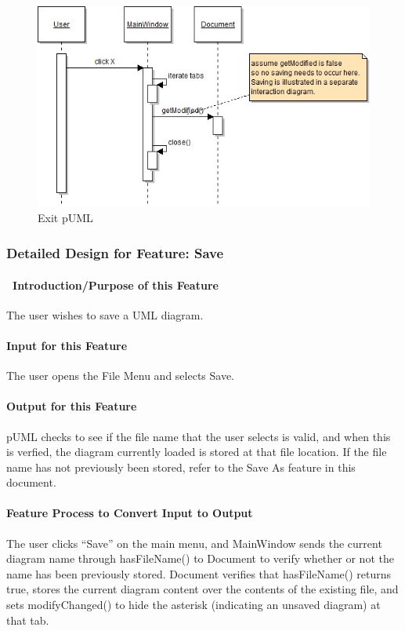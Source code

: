 \documentclass[twoside,letterpaper]{article}
\begin{document}
{\begin{figure}[h]
\centering
\includegraphics[width=6.0in]{IntExit.jpg}
\caption{Exit pUML}
\end{figure}
\clearpage



% 
%

\subsubsection{Detailed Design for Feature: Save }

\paragraph[\ Introduction/Purpose of this Feature]
{\ Introduction/Purpose of this Feature}
{
The user wishes to save a UML diagram.
}

\paragraph[Input for this Feature]{Input for this Feature}
{
The user opens the File Menu and selects Save.
}

\paragraph{Output for this Feature}
{
pUML checks to see if the file name that the user selects is valid, and when this is verfied, the diagram currently loaded is stored at that file location. \newline
If the file name has not previously been stored, refer to the Save As feature in this document.
}

\paragraph{Feature Process to Convert Input to Output}
{
The user clicks ``Save'' on the main menu, and MainWindow sends the current diagram name through hasFileName() to Document to verify whether or not the name has been previously stored. Document verifies that hasFileName() returns true, stores the current diagram content over the contents of the existing file, and sets modifyChanged() to hide the asterisk (indicating an unsaved diagram) at that tab.
}

}
\end{document}
